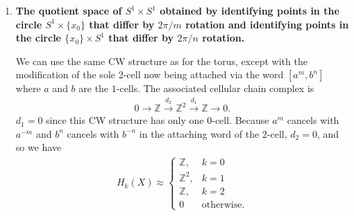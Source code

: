 \documentclass[a4paper,12pt]{article}
\begin{document}
\begin{enumerate}
\begin{enumerate}[label=(\alph*)]
            \item
                \boldmath\textbf{The quotient space of $S^1 \times S^1$ obtained by identifying points in the circle $S^1 \times \{x_0\}$ that differ by $2\pi/m$ rotation and identifying points in the circle $\{x_0\} \times S^1$ that differ by $2\pi/n$ rotation.
                }\unboldmath \par
                We can use the same CW structure as for the torus, except with the modification of the sole 2-cell now being attached via the word $[a^m, b^n]$ where $a$ and $b$ are the $1$-cells. The associated cellular chain complex is
                \begin{align*}
                    0 \rightarrow \mathbb{Z} \xrightarrow{d_2} \mathbb{Z}^2 \xrightarrow{d_1} \mathbb{Z} \rightarrow 0.
                \end{align*}
                $d_1 = 0$ since this CW structure has only one $0$-cell. Because $a^m$ cancels with $a^{-m}$ and $b^n$ cancels with $b^{-n}$ in the attaching word of the $2$-cell, $d_2 = 0$, and so we have
                \begin{align*}
                    H_k(X) \approx \begin{cases}
                        \mathbb{Z}, &k = 0 \\
                        \mathbb{Z}^2, &k = 1 \\
                        \mathbb{Z}, &k = 2 \\
                        0 &\text{otherwise}.
                    \end{cases}
                \end{align*}
        \end{enumerate}


\end{enumerate}
\end{document}
